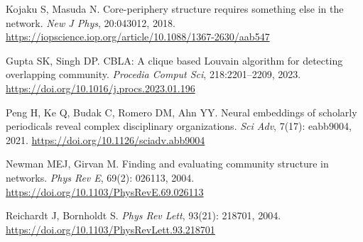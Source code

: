 \documentclass{bmcart}
\begin{document}
\begin{thebibliography}{99}
Kojaku S, Masuda N.
\newblock Core-periphery structure requires something else in the network.
\newblock \emph{New J Phys}, 20:043012, 2018.
\newblock \url{https://iopscience.iop.org/article/10.1088/1367-2630/aab547}

Gupta SK, Singh DP.
\newblock CBLA: A clique based Louvain algorithm for detecting overlapping community.
\newblock \emph{Procedia Comput Sci}, 218:2201–2209, 2023.
\newblock \url{https://doi.org/10.1016/j.procs.2023.01.196}

Peng H, Ke Q, Budak C, Romero DM, Ahn YY.
\newblock Neural embeddings of scholarly periodicals reveal complex disciplinary organizations.
\newblock \emph{Sci Adv}, 7(17): eabb9004, 2021.
\newblock \url{https://doi.org/10.1126/sciadv.abb9004}

Newman MEJ, Girvan M.
\newblock Finding and evaluating community structure in networks.
\newblock \emph{Phys Rev E}, 69(2): 026113, 2004.
\newblock \url{https://doi.org/10.1103/PhysRevE.69.026113}

Reichardt J, Bornholdt S.
\newblock \emph{Phys Rev Lett}, 93(21): 218701, 2004.
\newblock \url{https://doi.org/10.1103/PhysRevLett.93.218701}

\end{thebibliography}
\end{document}
